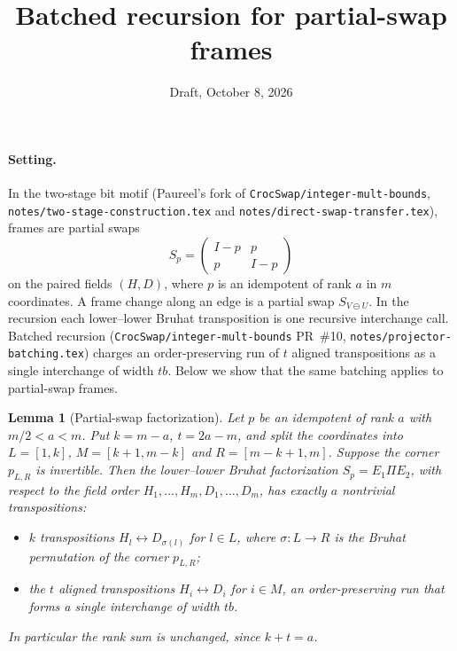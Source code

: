 \documentclass[11pt]{article}
\title{Batched recursion for partial-swap frames}
\date{Draft, October 8, 2026}
\newtheorem{lemma}{Lemma}
\theoremstyle{remark}\newtheorem*{remark}{Remark}
\begin{document}
\maketitle

\paragraph{Setting.} In the two-stage bit motif (Paureel's fork of \texttt{CrocSwap/integer-mult-bounds},
\texttt{notes/two-stage-construction.tex} and \texttt{notes/direct-swap-transfer.tex}), frames are partial
swaps
\[
 S_p=\begin{pmatrix}I-p&p\\p&I-p\end{pmatrix}
\]
on the paired fields $(H,D)$, where $p$ is an idempotent of rank $a$ in $m$ coordinates. A frame change
along an edge is a partial swap $S_{V\ominus U}$. In the recursion each lower--lower Bruhat transposition is
one recursive interchange call. Batched recursion (\texttt{CrocSwap/integer-mult-bounds} PR~\#10,
\texttt{notes/projector-batching.tex}) charges an order-preserving run of $t$ aligned transpositions as a
single interchange of width $tb$. Below we show that the same batching applies to partial-swap frames.

\begin{lemma}[Partial-swap factorization]\label{lem:psbatch}
Let $p$ be an idempotent of rank $a$ with $m/2<a<m$. Put $k=m-a$, $t=2a-m$, and split the coordinates into
$L=[1,k]$, $M=[k+1,m-k]$ and $R=[m-k+1,m]$. Suppose the corner $p_{L,R}$ is invertible. Then the
lower--lower Bruhat factorization $S_p=E_1\Pi E_2$, with respect to the field order $H_1,\dots,H_m,D_1,\dots,D_m$,
has exactly $a$ nontrivial transpositions:
\begin{itemize}
\item $k$ transpositions $H_l\leftrightarrow D_{\sigma(l)}$ for $l\in L$, where $\sigma:L\to R$ is the
Bruhat permutation of the corner $p_{L,R}$;
\item the $t$ aligned transpositions $H_i\leftrightarrow D_i$ for $i\in M$, an order-preserving run that
forms a single interchange of width $tb$.
\end{itemize}
In particular the rank sum is unchanged, since $k+t=a$.
\end{lemma}
\end{document}
